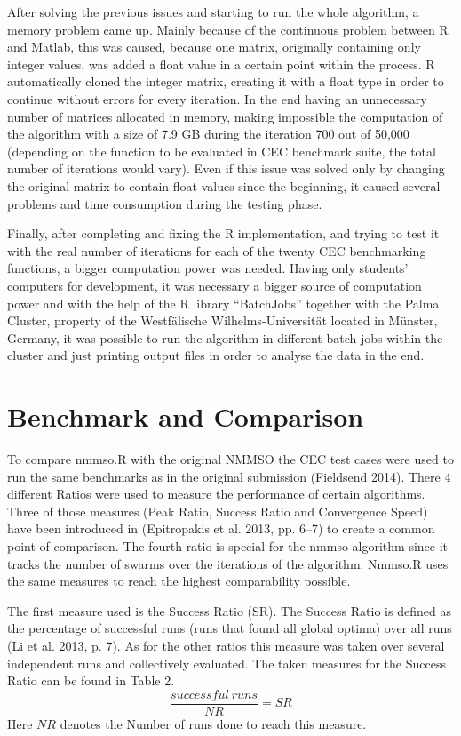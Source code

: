 \documentclass[12pt,a4paper]{article}
\begin{document}
After solving the previous issues and starting to run the whole
algorithm, a memory problem came up. Mainly because of the continuous
problem between R and Matlab, this was caused, because one matrix,
originally containing only integer values, was added a float value in a
certain point within the process. R automatically cloned the integer
matrix, creating it with a float type in order to continue without
errors for every iteration. In the end having an unnecessary number of
matrices allocated in memory, making impossible the computation of the
algorithm with a size of 7.9 GB during the iteration 700 out of 50,000
(depending on the function to be evaluated in CEC benchmark suite, the
total number of iterations would vary). Even if this issue was solved
only by changing the original matrix to contain float values since the
beginning, it caused several problems and time consumption during the
testing phase.

Finally, after completing and fixing the R implementation, and trying to
test it with the real number of iterations for each of the twenty CEC
benchmarking functions, a bigger computation power was needed. Having
only students' computers for development, it was necessary a bigger
source of computation power and with the help of the R library
``BatchJobs'' together with the Palma Cluster, property of the
Westfälische Wilhelms-Universität located in Münster, Germany, it was
possible to run the algorithm in different batch jobs within the cluster
and just printing output files in order to analyse the data in the end.

\section{Benchmark and Comparison}\label{benchmark-and-comparison}

To compare nmmso.R with the original NMMSO the CEC test cases were used
to run the same benchmarks as in the original submission (Fieldsend
2014). There 4 different Ratios were used to measure the performance of
certain algorithms. Three of those measures (Peak Ratio, Success Ratio
and Convergence Speed) have been introduced in (Epitropakis et al. 2013,
pp. 6--7) to create a common point of comparison. The fourth ratio is
special for the nmmso algorithm since it tracks the number of swarms
over the iterations of the algorithm. Nmmso.R uses the same measures to
reach the highest comparability possible.

The first measure used is the Success Ratio (SR). The Success Ratio is
defined as the percentage of successful runs (runs that found all global
optima) over all runs (Li et al. 2013, p. 7). As for the other ratios
this measure was taken over several independent runs and collectively
evaluated. The taken measures for the Success Ratio can be found in
Table 2. \[\frac{successful\ runs}{NR} = SR \] Here \(NR\) denotes the
Number of runs done to reach this measure. \newline
\end{document}

